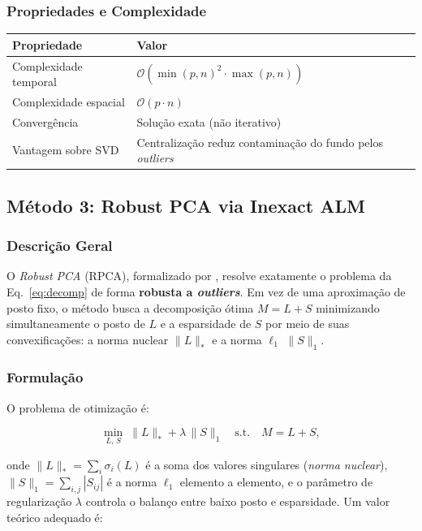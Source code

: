 \documentclass[12pt, a4paper]{article}
\begin{document}
\subsubsection{Propriedades e Complexidade}

\begin{tabular}{ll}
  \toprule
  Propriedade           & Valor \\
  \midrule
  Complexidade temporal & $\mathcal{O}(\min(p,n)^2 \cdot \max(p,n))$ \\
  Complexidade espacial & $\mathcal{O}(p \cdot n)$ \\
  Convergência          & Solução exata (não iterativo) \\
  Vantagem sobre SVD    & Centralização reduz contaminação do fundo pelos \emph{outliers} \\
  \bottomrule
\end{tabular}


\subsection{Método 3: Robust PCA via Inexact ALM}

\subsubsection{Descrição Geral}

O \emph{Robust PCA} (RPCA), formalizado por \textcite{candes2011robust}, resolve
exatamente o problema da Eq.~\eqref{eq:decomp} de forma \textbf{robusta a
\emph{outliers}}. Em vez de uma aproximação de posto fixo, o método busca a
decomposição ótima $M = L + S$ minimizando simultaneamente o posto de $L$ e a
esparsidade de $S$ por meio de suas convexificações: a norma nuclear
$\|L\|_*$ e a norma $\ell_1$ $\|S\|_1$.

\subsubsection{Formulação}

O problema de otimização é:

\begin{equation}
  \min_{L,\,S}\; \|L\|_* + \lambda\,\|S\|_1
  \quad \text{s.t.} \quad M = L + S,
  \label{eq:rpca}
\end{equation}

onde $\|L\|_* = \sum_i \sigma_i(L)$ é a soma dos valores singulares (\emph{norma
nuclear}), $\|S\|_1 = \sum_{i,j} |S_{ij}|$ é a norma $\ell_1$ elemento a elemento,
e o parâmetro de regularização $\lambda$ controla o balanço entre baixo posto e
esparsidade. Um valor teórico adequado é:
\end{document}
